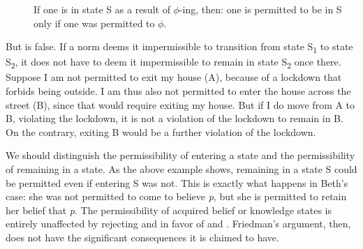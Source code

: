 \documentclass[12pt]{article}
\begin{document}
\begin{description}
    \item[\pp] If one is in state S as a result of $\phi$-ing, then: one is permitted to be in S only if one was permitted to $\phi$.
\end{description}
%
But \pp{} is false. If a norm deems it impermissible to transition from state S\textsubscript{1} to state S\textsubscript{2}, it does not have to deem it impermissible to remain in state S\textsubscript{2} once there. Suppose I am not permitted to exit my house (A), because of a lockdown that forbids being outside. I am thus also not permitted to enter the house across the street (B), since that would require exiting my house. But if I do move from A to B, violating the lockdown, it is not a violation of the lockdown to remain in B. On the contrary, exiting B would be a further violation of the lockdown.

We should distinguish the permissibility of entering a state and the permissibility of remaining in a state. As the above example shows, remaining in a state S could be permitted even if entering S was not. This is exactly what happens in Beth's case: she was not permitted to come to believe \textit{p}, but she is permitted to retain her belief that \textit{p}. The permissibility of acquired belief or knowledge states is entirely unaffected by rejecting \ep{} and \eo{} in favor of \epc{} and \eoc{}. Friedman's argument, then, does not have the significant consequences it is claimed to have.

\printbibliography
\end{document}
